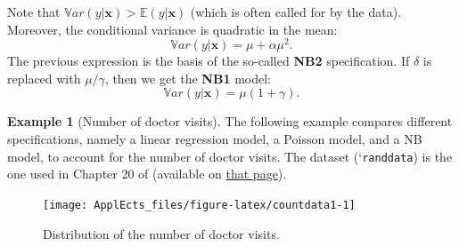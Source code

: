 \documentclass[
  12pt,
]{book}
\newenvironment{Shaded}{\begin{snugshade}}{\end{snugshade}}
\newcommand{\AttributeTok}[1]{\textcolor[rgb]{0.77,0.63,0.00}{#1}}
\newcommand{\CommentTok}[1]{\textcolor[rgb]{0.56,0.35,0.01}{\textit{#1}}}
\newcommand{\DecValTok}[1]{\textcolor[rgb]{0.00,0.00,0.81}{#1}}
\newcommand{\FunctionTok}[1]{\textcolor[rgb]{0.00,0.00,0.00}{#1}}
\newcommand{\NormalTok}[1]{#1}
\newcommand{\SpecialCharTok}[1]{\textcolor[rgb]{0.00,0.00,0.00}{#1}}
\theoremstyle{definition}
\theoremstyle{definition}
\newtheorem{example}{Example}[chapter]
\theoremstyle{definition}
\theoremstyle{definition}
\theoremstyle{remark}
\begin{document}
Note that \(\mathbb{V}ar(y|\mathbf{x}) > \mathbb{E}(y|\mathbf{x})\) (which is often called for by the data). Moreover, the conditional variance is quadratic in the mean:
\[
\mathbb{V}ar(y|\mathbf{x}) = \mu+\alpha \mu^2.
\]
The previous expression is the basis of the so-called \textbf{NB2} specification. If \(\delta\) is replaced with \(\mu/\gamma\), then we get the \textbf{NB1} model:
\[
\mathbb{V}ar(y|\mathbf{x}) = \mu(1+\gamma).
\]

\begin{example}[Number of doctor visits]
\protect\hypertarget{exm:Doctorvisits}{}\label{exm:Doctorvisits}The following example compares different specifications, namely a linear regression model, a Poisson model, and a NB model, to account for the number of doctor visits. The dataset (`\texttt{randdata}) is the one used in Chapter 20 of \citet{Cameron_Trivedi_2005} (available on \href{http://cameron.econ.ucdavis.edu/mmabook/mmadata.html}{that page}).

\begin{Shaded}
\end{Shaded}

\begin{figure}
\texttt{[image: ApplEcts\_files/figure-latex/countdata1-1]} \caption{Distribution of the number of doctor visits.}\label{fig:countdata1}
\end{figure}


\end{example}
\end{document}

